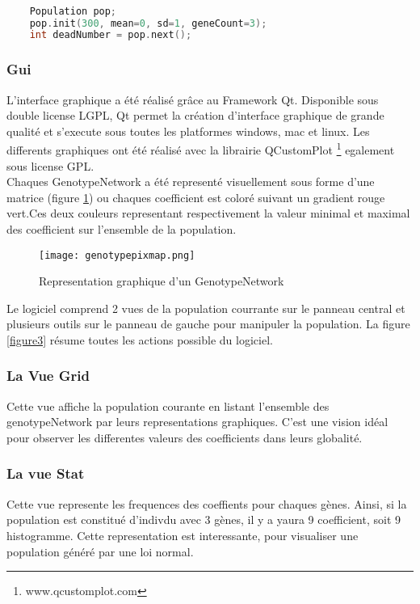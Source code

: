 \documentclass{article}
\begin{document}
	\begin{lstlisting}[language=C++, caption=Generation d'une population et basculement vers la génération suivante, label={code3}]

	Population pop;
	pop.init(300, mean=0, sd=1, geneCount=3); 
	int deadNumber = pop.next();

	\end{lstlisting}

	\subsubsection {Gui}
	L'interface graphique a été réalisé grâce au Framework Qt. Disponible sous double license LGPL, Qt permet la création d'interface graphique de grande qualité et s'execute sous toutes les platformes windows, mac et linux. Les differents graphiques ont été réalisé avec la librairie QCustomPlot \footnote{www.qcustomplot.com} egalement sous license GPL. \\
	Chaques GenotypeNetwork a été representé visuellement sous forme d'une matrice (figure \ref{figure2}) ou chaques coefficient est coloré suivant un gradient rouge vert.Ces deux couleurs representant respectivement la valeur minimal et maximal des coefficient sur l'ensemble de la population.

	\begin{figure}[h]
	\label{figure2}
	\caption[test]{Representation graphique d'un GenotypeNetwork }
	\centering
	\texttt{[image: genotypepixmap.png]}
	\end{figure}


	\clearpage
	Le logiciel comprend 2 vues de la population courrante sur le panneau central et plusieurs outils sur le panneau de gauche pour manipuler la population. La figure \ref{figure3} résume toutes les actions possible du logiciel.
	\subsubsection {La Vue Grid}
	Cette vue affiche la population courante en listant l'ensemble des genotypeNetwork par leurs representations graphiques. C'est une vision idéal pour observer les differentes valeurs des coefficients dans leurs globalité. 
	\subsubsection { La vue Stat}
	Cette vue represente les frequences des coeffients pour chaques gènes. Ainsi, si la population est constitué d'indivdu avec 3 gènes, il y a yaura 9 coefficient, soit 9 histogramme. Cette representation est interessante, pour visualiser une population généré par une loi normal.
\end{document}
